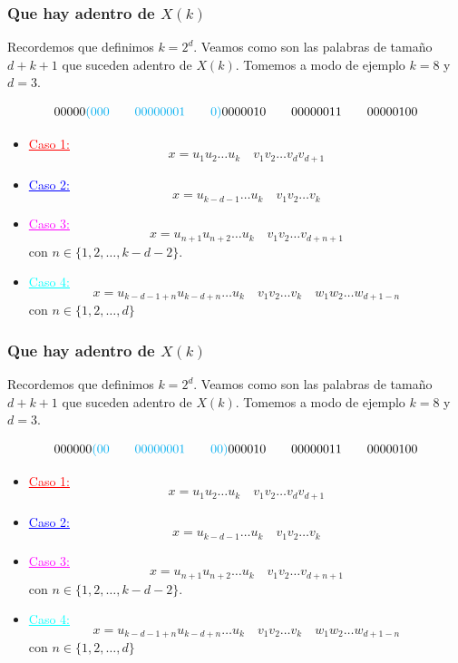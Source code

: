 \documentclass[10pt,mathserif]{beamer}%
\begin{document}
\begin{frame}
  \frametitle{Que hay adentro de $X(k)$}
  Recordemos que definimos $k = 2^d$.
  Veamos como son las palabras de tamaño $d + k + 1$ que suceden adentro de $X(k)$. Tomemos a modo de ejemplo $k = 8$ y $d = 3$.

  $$00000\textcolor{cyan}{(000 \qquad 00000001 \qquad 0)}  0000010 \qquad 00000011 \qquad 00000100$$

    \begin{itemize}
    \item \textcolor{red}{\underline{Caso 1:}}
    $$x = u_1 u_2 \dots u_k \quad v_1 v_2 \dots v_{d} v_{d + 1}$$  
    \item \textcolor{blue}{\underline{Caso 2:}}
    $$ x = u_{k-d-1} \dots u_k \quad v_1 v_2 \dots v_k$$
    \item \textcolor{magenta}{\underline{Caso 3:}}
    $$x = u_{n+1} u_{n+2} \dots u_k \quad  v_1 v_2 \dots v_{d+n+1} $$
    con $n \in \{1,2,\dots ,k - d - 2\}$.
    \item \textcolor{cyan}{\underline{Caso 4:}}
    $$ x = u_{k-d-1+n} u_{k-d+n} \dots u_k \quad v_1 v_2 \dots v_k \quad w_1 w_2 \dots w_{d+1-n}$$
    con $n \in \{1, 2, \dots , d\}$
  \end{itemize}
\end{frame}

\begin{frame}
  \frametitle{Que hay adentro de $X(k)$}
  Recordemos que definimos $k = 2^d$.
  Veamos como son las palabras de tamaño $d + k + 1$ que suceden adentro de $X(k)$. Tomemos a modo de ejemplo $k = 8$ y $d = 3$.

  $$000000\textcolor{cyan}{(00 \qquad 00000001 \qquad 00)}  000010 \qquad 00000011 \qquad 00000100$$

    \begin{itemize}
    \item \textcolor{red}{\underline{Caso 1:}}
    $$x = u_1 u_2 \dots u_k \quad v_1 v_2 \dots v_{d} v_{d + 1}$$  
    \item \textcolor{blue}{\underline{Caso 2:}}
    $$ x = u_{k-d-1} \dots u_k \quad v_1 v_2 \dots v_k$$
    \item \textcolor{magenta}{\underline{Caso 3:}}
    $$x = u_{n+1} u_{n+2} \dots u_k \quad  v_1 v_2 \dots v_{d+n+1} $$
    con $n \in \{1,2,\dots ,k - d - 2\}$.
    \item \textcolor{cyan}{\underline{Caso 4:}}
    $$ x = u_{k-d-1+n} u_{k-d+n} \dots u_k \quad v_1 v_2 \dots v_k \quad w_1 w_2 \dots w_{d+1-n}$$
    con $n \in \{1, 2, \dots , d\}$
  \end{itemize}
\end{frame}
\end{document}
